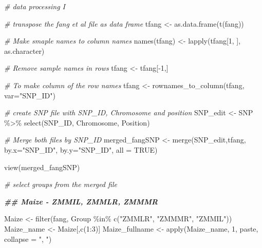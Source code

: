 \documentclass[
]{article}
\newenvironment{Shaded}{\begin{snugshade}}{\end{snugshade}}
\newcommand{\AttributeTok}[1]{\textcolor[rgb]{0.77,0.63,0.00}{#1}}
\newcommand{\CommentTok}[1]{\textcolor[rgb]{0.56,0.35,0.01}{\textit{#1}}}
\newcommand{\ConstantTok}[1]{\textcolor[rgb]{0.00,0.00,0.00}{#1}}
\newcommand{\DecValTok}[1]{\textcolor[rgb]{0.00,0.00,0.81}{#1}}
\newcommand{\DocumentationTok}[1]{\textcolor[rgb]{0.56,0.35,0.01}{\textbf{\textit{#1}}}}
\newcommand{\FunctionTok}[1]{\textcolor[rgb]{0.00,0.00,0.00}{#1}}
\newcommand{\NormalTok}[1]{#1}
\newcommand{\OtherTok}[1]{\textcolor[rgb]{0.56,0.35,0.01}{#1}}
\newcommand{\SpecialCharTok}[1]{\textcolor[rgb]{0.00,0.00,0.00}{#1}}
\newcommand{\StringTok}[1]{\textcolor[rgb]{0.31,0.60,0.02}{#1}}
\begin{document}
\begin{Shaded}
\begin{Highlighting}[]
\CommentTok{\# data processing I}


\CommentTok{\# transpose the fang et al file as data frame }
\NormalTok{tfang }\OtherTok{\textless{}{-}} \FunctionTok{as.data.frame}\NormalTok{(}\FunctionTok{t}\NormalTok{(fang))}

\CommentTok{\# Make smaple names to column names}
\FunctionTok{names}\NormalTok{(tfang) }\OtherTok{\textless{}{-}} \FunctionTok{lapply}\NormalTok{(tfang[}\DecValTok{1}\NormalTok{, ], as.character)}

\CommentTok{\# Remove sample names in rows}
\NormalTok{tfang }\OtherTok{\textless{}{-}}\NormalTok{ tfang[}\SpecialCharTok{{-}}\DecValTok{1}\NormalTok{,]}

\CommentTok{\# To make column of the row names}
\NormalTok{tfang }\OtherTok{\textless{}{-}} \FunctionTok{rownames\_to\_column}\NormalTok{(tfang, }\AttributeTok{var=}\StringTok{"SNP\_ID"}\NormalTok{)}

\CommentTok{\# create SNP file with SNP\_ID, Chromosome and position}
\NormalTok{SNP\_edit }\OtherTok{\textless{}{-}}\NormalTok{ SNP }\SpecialCharTok{\%\textgreater{}\%} \FunctionTok{select}\NormalTok{(SNP\_ID, Chromosome, Position)}

\CommentTok{\# Merge both files by SNP\_ID}
\NormalTok{merged\_fangSNP }\OtherTok{\textless{}{-}} \FunctionTok{merge}\NormalTok{(SNP\_edit,tfang, }\AttributeTok{by.x=}\StringTok{"SNP\_ID"}\NormalTok{, }\AttributeTok{by.y=}\StringTok{"SNP\_ID"}\NormalTok{, }\AttributeTok{all =} \ConstantTok{TRUE}\NormalTok{)}

\FunctionTok{view}\NormalTok{(merged\_fangSNP)}

\CommentTok{\# select groups from the merged file}

\DocumentationTok{\#\# Maize {-} ZMMIL, ZMMLR, ZMMMR}

\NormalTok{Maize }\OtherTok{\textless{}{-}} \FunctionTok{filter}\NormalTok{(fang, Group }\SpecialCharTok{\%in\%} \FunctionTok{c}\NormalTok{(}\StringTok{"ZMMLR"}\NormalTok{, }\StringTok{"ZMMMR"}\NormalTok{, }\StringTok{"ZMMIL"}\NormalTok{))}
\NormalTok{Maize\_name }\OtherTok{\textless{}{-}}\NormalTok{ Maize[,}\FunctionTok{c}\NormalTok{(}\DecValTok{1}\SpecialCharTok{:}\DecValTok{3}\NormalTok{)]}
\NormalTok{Maize\_fullname }\OtherTok{\textless{}{-}} \FunctionTok{apply}\NormalTok{(Maize\_name, }\DecValTok{1}\NormalTok{, paste, }\AttributeTok{collapse =} \StringTok{", "}\NormalTok{) }


\end{Highlighting}
\end{Shaded}
\end{document}
